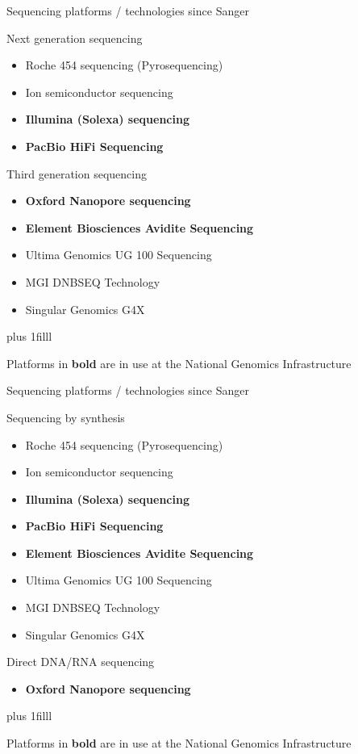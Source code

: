 \documentclass[10pt]{beamer}
\newcommand{\credit}[1]{{\vskip0pt plus 1filll \par \raggedleft \scriptsize \mdseries \color{mDarkBrown} #1 \par}}
\begin{document}
\begin{frame}{Sequencing platforms / technologies since Sanger}
	\begin{exampleblock}{Next generation sequencing}
		\begin{itemize}
			\item Roche 454 sequencing (Pyrosequencing)
			\item Ion semiconductor sequencing
			\item \textbf{Illumina (Solexa) sequencing}
			\item \textbf{PacBio HiFi Sequencing}
		\end{itemize}
	\end{exampleblock}
	\begin{alertblock}{Third generation sequencing}
		\begin{itemize}
			\item \textbf{Oxford Nanopore sequencing}
			\item \textbf{Element Biosciences Avidite Sequencing}
			\item Ultima Genomics UG 100 Sequencing
			\item MGI DNBSEQ Technology
			\item Singular Genomics G4X
		\end{itemize}
	\end{alertblock}
\credit{Platforms in \textbf{bold} are in use at the National Genomics Infrastructure}
\end{frame}

\begin{frame}{Sequencing platforms / technologies since Sanger}
	\begin{exampleblock}{Sequencing by synthesis}
		\begin{itemize}
			\item Roche 454 sequencing (Pyrosequencing)
			\item Ion semiconductor sequencing
			\item \textbf{Illumina (Solexa) sequencing}
			\item \textbf{PacBio HiFi Sequencing}
			\item \textbf{Element Biosciences Avidite Sequencing}
			\item Ultima Genomics UG 100 Sequencing
			\item MGI DNBSEQ Technology
			\item Singular Genomics G4X
		\end{itemize}
	\end{exampleblock}
	\begin{alertblock}{Direct DNA/RNA sequencing}
		\begin{itemize}
			\item \textbf{Oxford Nanopore sequencing}
		\end{itemize}
	\end{alertblock}
\credit{Platforms in \textbf{bold} are in use at the National Genomics Infrastructure}
\end{frame}
\end{document}
